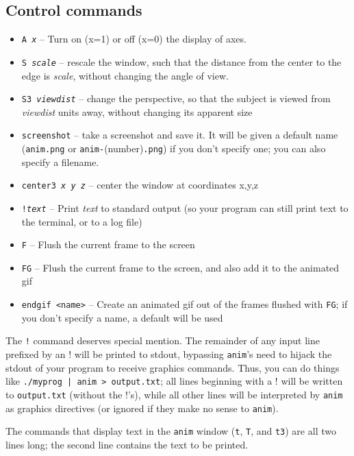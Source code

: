 \documentclass[12pt]{article}
\begin{document}
\subsection{Control commands}
\begin{itemize}
\item {\tt A {\it x}} -- Turn on (x=1) or off (x=0) the display of axes. 
\item {\tt S {\it scale}} -- rescale the window, such that the distance from the center to the edge is {\it scale}, without changing
the angle of view.
\item {\tt S3 {\it viewdist}} -- change the perspective, so that the subject is viewed from {\it viewdist} units away, without changing 
its apparent size
\item {\tt screenshot} -- take a screenshot and save it. It will be given a default name ({\tt anim.png}
or {\tt anim-}(number){\tt.png}) if you don't specify one; you can also specify a filename.
\item {\tt center3 {\it x y z}} -- center the window at coordinates x,y,z
\item {\tt !{\it text}} -- Print {\it text} to standard output (so your program can still print text to the terminal, or to a log file)
\item {\tt F} -- Flush the current frame to the screen
\item {\tt FG} -- Flush the current frame to the screen, and also add it to the animated gif
\item {\tt endgif <name>} -- Create an animated gif out of the frames flushed with {\tt FG}; if you don't specify a name, a default will be used

\end{itemize}


The {\tt !} command deserves special mention. The remainder of any input line prefixed by an ! will be printed to stdout, bypassing {\tt anim}'s need to hijack
the stdout of your program to receive graphics commands. Thus, you can do things like {\tt ./myprog | anim > output.txt}; all lines beginning with a ! will be 
written to {\tt output.txt} (without the !'s), while all other lines will be interpreted by {\tt anim} as graphics directives 
(or ignored if they make no sense to {\tt anim}).

The commands that display text in the {\tt anim} window ({\tt t}, {\tt T}, and {\tt t3}) are all two lines long; the second line contains the text to be printed.
\end{document}
